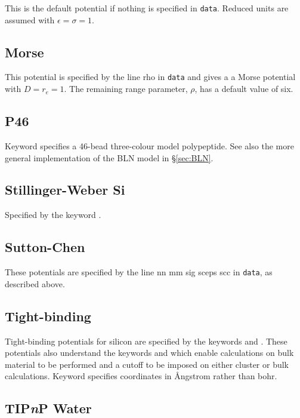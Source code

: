 {This is the default potential if nothing is specified in {\tt data}. Reduced units are
assumed with $\epsilon=\sigma=1$.

\subsection{Morse}

This potential is specified by the line { rho\/} in {\tt data} and gives a
a Morse potential with $D=r_e=1$. 
The remaining range parameter,\cite{braierbw90,doyewb95,doyew96a} $\rho$, has a default 
value of six.

\subsection{P46}

Keyword {\/} specifies a 46-bead three-colour model polypeptide. 
See also the more general implementation of the BLN model in \S \ref{sec:BLN}.

\subsection{Stillinger-Weber Si}

Specified by the keyword {\/}.

\subsection{Sutton-Chen}

These potentials\cite{suttonc90} are specified by the line { nn mm sig sceps scc\/} in {\tt data},
as described above. 

\subsection{Tight-binding}

Tight-binding potentials for silicon are specified by the keywords {\/} 
and {\/}.
These potentials also understand the 
keywords {\/} and {\/} which enable calculations on bulk material
to be performed and a cutoff to be imposed on either cluster or bulk calculations.
Keyword {\/} specifies coordinates in \AA ngstrom rather than bohr.

\subsection{TIP{\it n\/}P Water}

}
